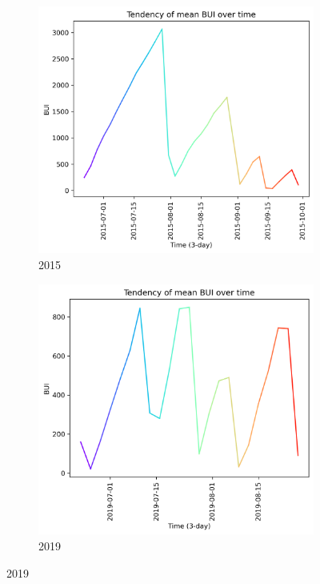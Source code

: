 \begin{figure}[h]
	\caption{BUI mean tendency graph}
	\centering
	\begin{subfigure}{0.49\textwidth}
		\centering
		\includegraphics[width=\textwidth]{graphs/2015/tendency/2015_tendency_graph_BUI.png}
		\caption{2015}
		\label{fig:mean_tendency_bui_2015}
	\end{subfigure}
	\hfill
	\begin{subfigure}{0.49\textwidth}
		\centering
		\includegraphics[width=\textwidth]{graphs/2019/tendency/2019_tendency_graph_BUI.png}
		\caption{2019}
		\label{fig:mean_tendency_bui_2019}
	\end{subfigure}
	\label{fig:mean_tendency_bui}
\end{figure}




